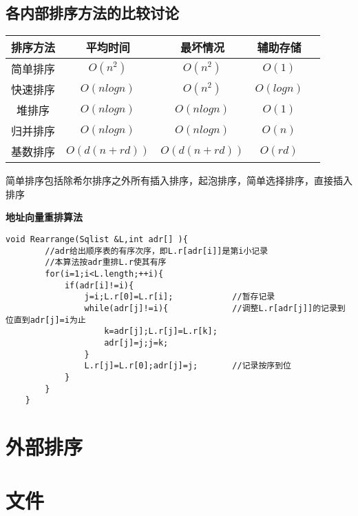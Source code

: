 \documentclass[UTF8]{ctexart}
\newcommand{\mb}[1]{\textbf{#1}}
\begin{document}
\subsection{各内部排序方法的比较讨论}


\begin{center}
    \begin{tabular}{ccccc}
        \toprule
        排序方法 & 平均时间 & 最坏情况 & 辅助存储   \\
        \midrule
        简单排序 & $O(n^2)$     &  $O(n^2)$ & $O(1)$  \\
        快速排序 & $O(nlogn)$   & $O(n^2)$  & $O(logn)$  \\
        堆排序   & $O(nlogn)$   & $O(nlogn)$  & $O(1)$  \\
        归并排序 & $O(nlogn)$   & $O(nlogn)$  & $O(n)$  \\
        基数排序 & $O(d(n+rd))$ & $O(d(n+rd))$  & $O(rd)$  \\
        \bottomrule
    \end{tabular}%
\end{center}


 

简单排序包括除希尔排序之外所有插入排序，起泡排序，简单选择排序，直接插入排序

\mb{地址向量重排算法}

\begin{lstlisting}[style=v1]
    void Rearrange(Sqlist &L,int adr[] ){
        //adr给出顺序表的有序次序，即L.r[adr[i]]是第i小记录
        //本算法按adr重排L.r使其有序
        for(i=1;i<L.length;++i){
            if(adr[i]!=i){
                j=i;L.r[0]=L.r[i];            //暂存记录  
                while(adr[j]!=i){             //调整L.r[adr[j]]的记录到位直到adr[j]=i为止  
                    k=adr[j];L.r[j]=L.r[k];     
                    adr[j]=j;j=k;
                }
                L.r[j]=L.r[0];adr[j]=j;       //记录按序到位 
            }
        }
    }
\end{lstlisting}


\newpage
\section{外部排序}
\newpage
\section{文件}










 
\end{document}

